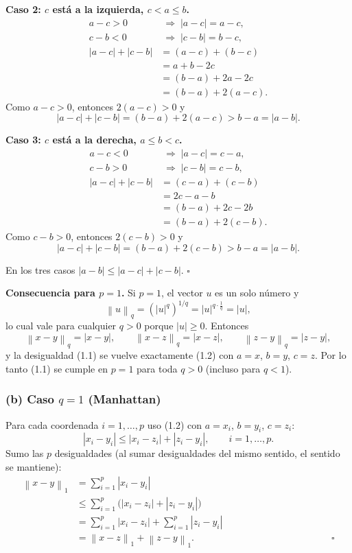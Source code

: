 \documentclass[11pt]{article}\usepackage[]{graphicx}\usepackage[]{xcolor}
\newcommand{\norm}[1]{\left\lVert #1 \right\rVert}
\begin{document}
\textbf{Caso 2: $c$ está a la izquierda, $c < a \le b$.}
\begin{align*}
a - c > 0 &\;\Rightarrow\; |a-c| = a-c,\\
c - b < 0 &\;\Rightarrow\; |c-b| = b-c,\\
|a-c| + |c-b| &= (a-c) + (b-c)\\
&= a + b - 2c\\
&= (b-a) + 2a - 2c\\
&= (b-a) + 2(a-c).
\end{align*}
Como $a - c > 0$, entonces $2(a-c) > 0$ y
\[
|a-c| + |c-b| = (b-a) + 2(a-c) > b-a = |a-b|.
\]

\textbf{Caso 3: $c$ está a la derecha, $a \le b < c$.}
\begin{align*}
a - c < 0 &\;\Rightarrow\; |a-c| = c-a,\\
c - b > 0 &\;\Rightarrow\; |c-b| = c-b,\\
|a-c| + |c-b| &= (c-a) + (c-b)\\
&= 2c - a - b\\
&= (b-a) + 2c - 2b\\
&= (b-a) + 2(c-b).
\end{align*}
Como $c - b > 0$, entonces $2(c-b)>0$ y
\[
|a-c| + |c-b| = (b-a) + 2(c-b) > b-a = |a-b|.
\]

En los tres casos $|a-b| \le |a-c| + |c-b|$. \hfill$\square$

\textbf{Consecuencia para $p=1$.} Si $p=1$, el vector $u$ es un solo número y
\[
\norm{u}_q = \left(|u|^q\right)^{1/q} = |u|^{q\cdot \frac{1}{q}} = |u|,
\]
lo cual vale para cualquier $q>0$ porque $|u|\ge 0$. Entonces
\[
\norm{x-y}_q = |x-y|,\qquad \norm{x-z}_q = |x-z|,\qquad \norm{z-y}_q = |z-y|,
\]
y la desigualdad (1.1) se vuelve exactamente (1.2) con $a=x$, $b=y$, $c=z$. Por lo tanto (1.1) se cumple en $p=1$ para toda $q>0$ (incluso para $q<1$).

\subsubsection*{(b) Caso $q=1$ (Manhattan)}

Para cada coordenada $i = 1,\dots,p$ uso (1.2) con $a=x_i$, $b=y_i$, $c=z_i$:
\[
|x_i - y_i| \le |x_i - z_i| + |z_i - y_i|, \qquad i = 1,\dots,p.
\]
Sumo las $p$ desigualdades (al sumar desigualdades del mismo sentido, el sentido se mantiene):
\begin{align*}
\norm{x-y}_1 &= \sum_{i=1}^p |x_i - y_i|\\
&\le \sum_{i=1}^p \big(|x_i - z_i| + |z_i - y_i|\big)\\
&= \sum_{i=1}^p |x_i - z_i| + \sum_{i=1}^p |z_i - y_i|\\
&= \norm{x-z}_1 + \norm{z-y}_1. \hspace{6cm}\square
\end{align*}
\end{document}
